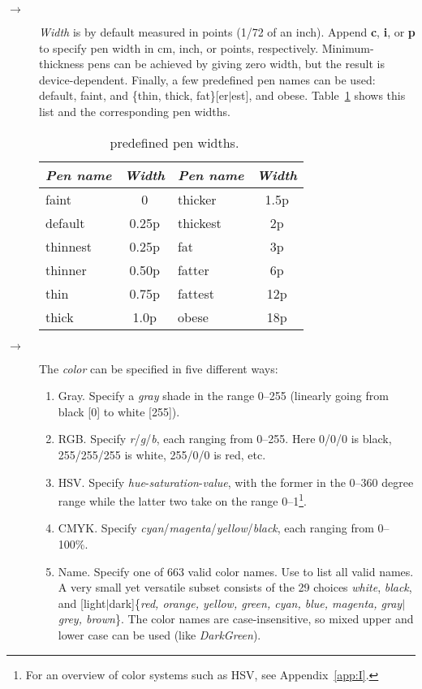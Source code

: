 \begin{description}
%
\item[$\rightarrow$]\emph{Width} is by default measured in points (1/72 of an inch).
Append \textbf{c}, \textbf{i}, or \textbf{p} to specify pen width in cm, inch, or points,
respectively.
Minimum-thickness pens can be achieved by
giving zero width, but the result is device-dependent.  Finally, a few
predefined pen names can be used: default, faint, and \{thin, thick, fat\}[er$|$est],
and obese.  Table~\ref{tbl:pennames} shows this list and the corresponding pen widths.
\begin{table}[h]
\centering
\begin{tabular}{|l|c||l|c|} \hline
\multicolumn{1}{|c|}{\emph{Pen name}}	&	\multicolumn{1}{c|}{\emph{Width}}	&	\multicolumn{1}{|c|}{\emph{Pen name}}	&	\multicolumn{1}{c|}{\emph{Width}} \\ \hline
faint		&	0	&	thicker		&	1.5p \\ \hline 
default		&	0.25p	&	thickest	&	2p \\ \hline
thinnest	&	0.25p	&	fat		&	3p \\ \hline
thinner		&	0.50p	&	fatter		&	6p \\ \hline 
thin		&	0.75p	&	fattest		&	12p \\ \hline  
thick		&	1.0p	&	obese		&	18p \\	\hline 
\end{tabular}
\caption{\gmt\ predefined pen widths.}
\label{tbl:pennames}
\end{table}

%
\item[$\rightarrow$]The \emph{color} can be specified in five different ways:
\begin{enumerate}
\item Gray. Specify a \emph{gray} shade in the range 0--255 (linearly going from black [0] to white [255]).
\item RGB. Specify \emph{r}/\emph{g}/\emph{b}, each ranging from 0--255.  Here 0/0/0 is black, 255/255/255 is white,
255/0/0 is red, etc.
\item HSV. Specify \emph{hue}-\emph{saturation}-\emph{value}, with the former in the 0--360 degree range while the latter
two take on the range 0--1\footnote{For an overview of color systems such as HSV, see Appendix~\ref{app:I}.}.
\item CMYK. Specify \emph{cyan}/\emph{magenta}/\emph{yellow}/\emph{black}, each ranging from 0--100\%.
\item Name.  Specify one of 663 valid color names.  Use  to list all valid names.
A very small yet versatile subset consists of the 29 choices \emph{white}, \emph{black}, and
[light$|$dark]\{\emph{red,
orange, yellow, green, cyan, blue, magenta, gray$|$grey, brown}\}.
The color names are case-insensitive, so mixed upper and lower case can be used (like
\emph{DarkGreen}).
\end{enumerate}


\end{description}
